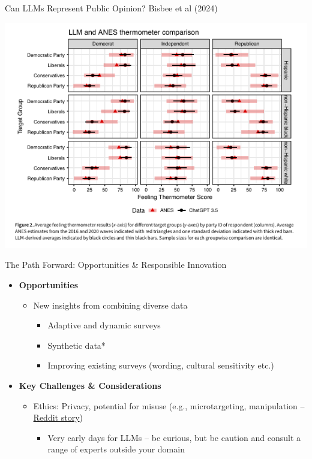 \documentclass[10pt,aspectratio=169]{beamer}
\newcommand{\nblue}[1]{{\color{ceruleanblue} {#1}}}
\begin{document}
\begin{frame}{Can LLMs Represent Public Opinion?}
	\nblue{Bisbee et al (2024)}
	\begin{center}
		\includegraphics[width=.6\textwidth]{figures/bisbee_results.png}
	\end{center}

\end{frame}








\begin{frame}{The Path Forward: Opportunities \& Responsible Innovation}

\begin{itemize}
    \item \textbf{Opportunities}
    \begin{itemize}
        \item New insights from combining diverse data
        \begin{itemize}
            \item Adaptive and dynamic surveys 
            \item Synthetic data*
            \item Improving existing surveys (wording, cultural sensitivity etc.)
        \end{itemize}
    \end{itemize}
    \item \textbf{Key Challenges \& Considerations}
    \begin{itemize}
        \item Ethics: Privacy, potential for misuse (e.g., microtargeting, manipulation -- \href{https://www.reddit.com/r/changemyview/comments/1k8b2hj/comment/mp4vgcm/?share_id=W7n2eWmaRZq3odRwfc_-5}{Reddit story})
        \begin{itemize}
            \item Very early days for LLMs -- be curious, but be caution and consult a range of experts outside your domain
        \end{itemize}
    \end{itemize}
\end{itemize}


\end{frame}
\end{document}
